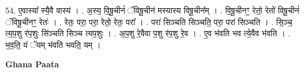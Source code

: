\documentclass[17pt]{extarticle}
\begin{document}
54. ए॒वास्या᳚ स्यै॒वै वास्य॑ । . अ॒स्य॒ वि॒षू॒चीनं॑ ॅविषू॒चीन॑ मस्यास्य विषू॒चीन᳚म् । . वि॒षू॒चीनꣳ॒॒ रेतो॒ रेतो॑ विषू॒चीनं॑ ॅविषू॒चीनꣳ॒॒ रेतः॑ । . रेतः॒ परा॒ परा॒ रेतो॒ रेतः॒ परा᳚ । . परा॑ सिञ्चति सिञ्चति॒ परा॒ परा॑ सिञ्चति । . सि॒ञ्च॒ त्य॒प॒शु र॑प॒शुः सि॑ञ्चति सिञ्च त्यप॒शुः । . अ॒प॒शु रे॒वैवा प॒शु र॑प॒शु रे॒व । . ए॒व भ॑वति भव त्ये॒वैव भ॑वति । . भ॒व॒ति॒ यं ॅयम् भ॑वति भवति॒ यम् । \newline

\textbf{Ghana Paata } \newline
\end{document}
